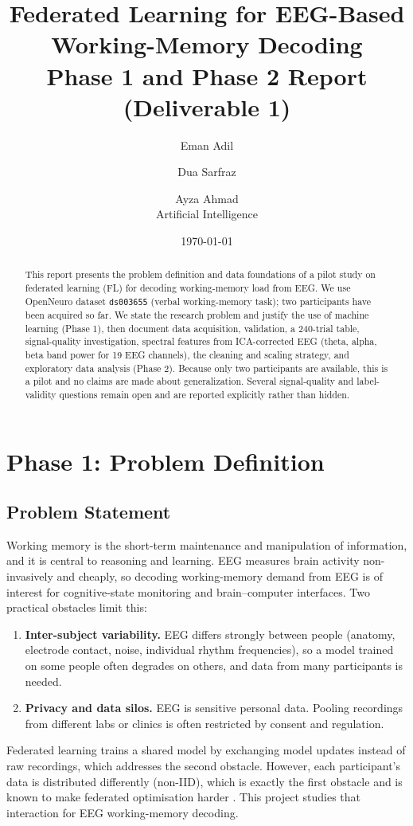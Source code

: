 \documentclass[11pt,a4paper]{article}
\title{Federated Learning for EEG-Based Working-Memory Decoding\\
\large Phase 1 and Phase 2 Report (Deliverable 1)}
\author{Eman Adil \and Dua Sarfraz \and Ayza Ahmad\\[3pt] {Artificial Intelligence}}
\date{\today}
\begin{document}
\maketitle

\begin{abstract}
This report presents the problem definition and data foundations of a pilot study on federated learning (FL)
for decoding working-memory load from EEG. We use OpenNeuro dataset \texttt{ds003655} (verbal working-memory
task); two participants have been acquired so far. We state the research problem and justify the use of machine
learning (Phase 1), then document data acquisition, validation, a 240-trial table, signal-quality investigation,
spectral features from ICA-corrected EEG (theta, alpha, beta band power for 19 EEG channels), the cleaning and scaling
strategy, and exploratory data analysis (Phase 2). Because only two participants are available, this is a pilot
and no claims are made about generalization. Several signal-quality and label-validity questions remain open and
are reported explicitly rather than hidden.
\end{abstract}

\tableofcontents
\newpage

\section{Phase 1: Problem Definition}

\subsection{Problem Statement}
Working memory is the short-term maintenance and manipulation of information, and it is central to reasoning and
learning. EEG measures brain activity non-invasively and cheaply, so decoding working-memory demand from EEG is of
interest for cognitive-state monitoring and brain--computer interfaces. Two practical obstacles limit this:
\begin{enumerate}[leftmargin=*]
  \item \textbf{Inter-subject variability.} EEG differs strongly between people (anatomy, electrode contact, noise,
  individual rhythm frequencies), so a model trained on some people often degrades on others, and data from many
  participants is needed.
  \item \textbf{Privacy and data silos.} EEG is sensitive personal data. Pooling recordings from different labs or
  clinics is often restricted by consent and regulation.
\end{enumerate}
Federated learning trains a shared model by exchanging model updates instead of raw recordings, which addresses the
second obstacle. However, each participant's data is distributed differently (non-IID), which is exactly the first
obstacle and is known to make federated optimisation harder \cite{mcmahan2017}. This project studies that
interaction for EEG working-memory decoding.
\end{document}

